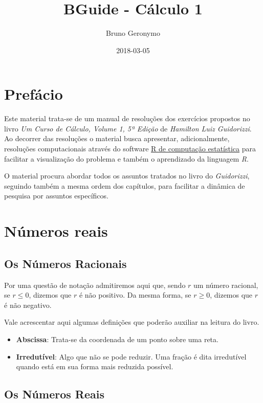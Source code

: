 \documentclass[]{book}
\title{BGuide - Cálculo 1}
\author{Bruno Geronymo}
\date{2018-03-05}
\providecommand{\tightlist}{%
  \setlength{\itemsep}{0pt}\setlength{\parskip}{0pt}}
\begin{document}
\maketitle

{
\setcounter{tocdepth}{1}
\tableofcontents
}
\chapter*{Prefácio}\label{prefacio}

Este material trata-se de um manual de resoluções dos exercícios
propostos no livro \emph{Um Curso de Cálculo, Volume 1, 5ª Edição} de
\emph{Hamilton Luiz Guidorizzi}. Ao decorrer das resoluções o material
busca apresentar, adicionalmente, resoluções computacionais através do
software \href{https://www.r-project.org/}{R de computação estatística}
para facilitar a visualização do problema e também o aprendizado da
linguagem \emph{R}.

O material procura abordar todos os assuntos tratados no livro do
\emph{Guidorizzi}, seguindo também a mesma ordem dos capítulos, para
facilitar a dinâmica de pesquisa por assuntos específicos.

\chapter{Números reais}\label{numeros-reais}

\section{Os Números Racionais}\label{os-numeros-racionais}

Por uma questão de notação admitiremos aqui que, sendo \(r\) um número
racional, se \(r \leqslant 0\), dizemos que \(r\) é não positivo. Da
mesma forma, se \(r \geqslant 0\), dizemos que \(r\) é não negativo.

Vale acrescentar aqui algumas definições que poderão auxiliar na leitura
do livro.

\begin{itemize}
\tightlist
\item
  \textbf{Abscissa}: Trata-se da coordenada de um ponto sobre uma reta.
\item
  \textbf{Irredutível}: Algo que não se pode reduzir. Uma fração é dita
  irredutível quando está em sua forma mais reduzida possível.
\end{itemize}

\section{Os Números Reais}\label{os-numeros-reais}
\end{document}
